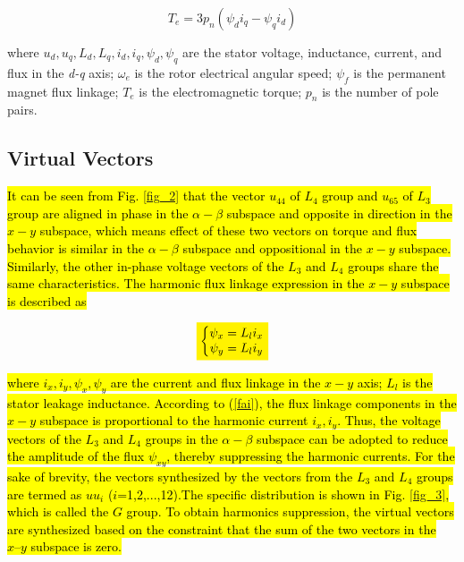\documentclass[sn-basic]{sn-jnl}
\newcommand{\mathcolorbox}[2]{\colorbox{#1}{$\displaystyle #2$}}
\theoremstyle{thmstyleone}%
\theoremstyle{thmstyletwo}%
\theoremstyle{thmstylethree}%
\theoremstyle{thmstyleone}%
\begin{document}
\begin{equation}
T_{e} = 3p_{n}\left( {\psi_{d}i_{q} - \psi_{q}i_{d}} \right)
\end{equation}



where $u_d, u_q, L_d, L_q, i_d, i_q, \psi_d, \psi_q$ are the stator voltage, inductance, current, and flux in the \textit{d-q} axis; $\omega_e$ is the rotor electrical angular speed; $\psi_f$ is the permanent magnet flux linkage; $T_e$ is the electromagnetic torque; $p_n$ is the number of pole pairs.

\subsection {Virtual Vectors}
\hl{It can be seen from Fig. {\ref{fig_2}} that the vector $u_{44}$ of  $L_{4}$ group and $u_{65}$ of $L_{3}$ group are aligned in phase in the $\alpha-\beta$ subspace and opposite in direction in the $x-y$ subspace, which means effect of these two vectors on torque and flux behavior is similar in the $\alpha-\beta$ subspace and oppositional in the $x-y$ subspace. Similarly, the other in-phase voltage vectors of the $L_{3}$ and $L_{4}$ groups share the same characteristics.
The harmonic flux linkage expression in the $x-y$ subspace is described as
}

\begin{equation}\label{fai}
\mathcolorbox{yellow}{\left\{ \begin{matrix}
   {{\psi }_{x}}={{L}_{l}}{{i}_{x}}  \\
   {{\psi }_{y}}={{L}_{l}}{{i}_{y}}  \\
\end{matrix} \right.}
\end{equation}

\hl{where $i_x, i_y, \psi_x, \psi_y$ are the current and flux linkage in the $x-y$ axis; $L_l$ is the stator leakage inductance. According to ({\ref{fai}}), the flux linkage components in the $x-y$ subspace is proportional to the harmonic current $i_x, i_y$. Thus, the voltage vectors of the $L_3$ and $L_4$ groups in the $\alpha-\beta$ subspace can be adopted to reduce the amplitude of the flux $\psi_{xy}$, thereby suppressing the harmonic currents. For the sake of brevity, the vectors synthesized by the vectors from the $L_3$ and $L_4$ groups are termed as $uu_i$ ($i$=1,2,...,12).The specific distribution is shown in Fig. {\ref{fig_3}}, which is called the $G$ group. To obtain harmonics suppression, the virtual vectors are synthesized based on the constraint that the sum of the two vectors in the $x–y$ subspace is zero. 
}
\end{document}
